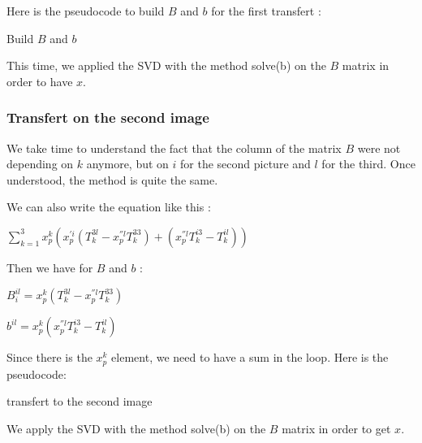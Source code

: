 \documentclass{report}
\begin{document}
Here is the pseudocode to build $B$ and $b$ for the first transfert : 
\begin{algorithm}
\SetLine
\caption{Build $B$ and $b$}
\SetLine
{}
\end{algorithm}

This time, we applied the SVD with the method solve(b) on the $B$ matrix in order to have $x$. 

\subsubsection{Transfert on the second image}
We take time to understand the fact that the column of the matrix $B$ were not depending on $k$ anymore, but on $i$ for the second picture and $l$ for the third. Once understood, the method is quite the same. 

We can also write the equation like this : 

\begin{center}
 $ \displaystyle { \sum_{k = 1}^{3}} x_{p}^{k}(x_{p}^{'i} (T_{k}^{3l} - x_{p}^{''l}T_{k}^{33}) + ( x_{p}^{''l}T_{k}^{i3} - T_{k}^{il} ))$
\end{center}

Then we have for $B$ and $b$ :  
\begin{center}
$B_{i}^{il} = x_{p}^{k}(T_{k}^{3l} - x_{p}^{''l}T_{k}^{33})$
\end{center}
\begin{center}
$b^{il} = x_{p}^{k}(x_{p}^{''l}T_{k}^{i3} - T_{k}^{il})$
\end{center}

Since there is the $x_{p}^{k}$ element, we need to have a sum in the loop. Here is the pseudocode:

\begin{algorithm}
\SetLine
\caption{transfert to the second image}
\SetLine
{}
\end{algorithm}
We apply the SVD with the method solve(b) on the $B$ matrix in order to get $x$. 
\end{document}
